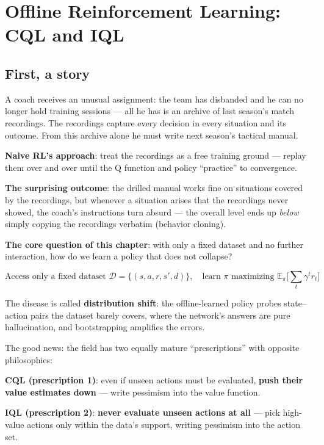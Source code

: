 \documentclass{article}
\begin{document}
\section*{Offline Reinforcement Learning: CQL and IQL}

\subsection*{First, a story}

A coach receives an unusual assignment: the team has disbanded and he can no longer hold training sessions --- all he has is an archive of last season's match recordings. The recordings capture every decision in every situation and its outcome. From this archive alone he must write next season's tactical manual.

\textbf{Naive RL's approach}: treat the recordings as a free training ground --- replay them over and over until the Q function and policy ``practice'' to convergence.

\textbf{The surprising outcome}: the drilled manual works fine on situations covered by the recordings, but whenever a situation arises that the recordings never showed, the coach's instructions turn absurd --- the overall level ends up \emph{below} simply copying the recordings verbatim (behavior cloning).

\textbf{The core question of this chapter}: with only a fixed dataset and no further interaction, how do we learn a policy that does not collapse?

\[
\boxed{\text{Access only a fixed dataset } \mathcal{D}=\{(s,a,r,s',d)\},\quad \text{learn } \pi \text{ maximizing } \mathbb{E}_\pi\!\Big[\sum_t \gamma^t r_t\Big]}
\]

The disease is called \textbf{distribution shift}: the offline-learned policy probes state--action pairs the dataset barely covers, where the network's answers are pure hallucination, and bootstrapping amplifies the errors.

The good news: the field has two equally mature ``prescriptions'' with opposite philosophies:

\textbf{CQL (prescription 1)}: even if unseen actions must be evaluated, \textbf{push their value estimates down} --- write pessimism into the value function.

\textbf{IQL (prescription 2)}: \textbf{never evaluate unseen actions at all} --- pick high-value actions only within the data's support, writing pessimism into the action set.
\end{document}
